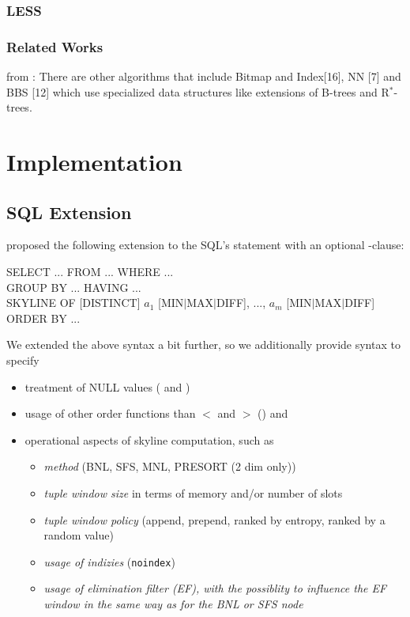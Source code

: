 \subsection{LESS}

\subsection{Related Works}
from \citep{Chaudhuri2006}: 
 There are other algorithms that include Bitmap and Index[16], NN
[7] and BBS [12] which use specialized data structures like
extensions of B-trees and R$^*$-trees.

\chapter{Implementation}
\section{SQL Extension}

\citet{Borzsonyi2001} proposed the following extension to the SQL's  statement with an optional -clause:
\begin{sql}
SELECT ... FROM ... WHERE ... \\
GROUP BY ... HAVING ...       \\
SKYLINE OF \textnormal{[}DISTINCT\textnormal{]} $a_1$ \textnormal{[}MIN$|$MAX$|$DIFF\textnormal{]}, ..., $a_m$ \textnormal{[}MIN$|$MAX$|$DIFF\textnormal{]} \\
ORDER BY ...
\end{sql}

We extended the above syntax a bit further, so we additionally provide syntax to specify
\begin{itemize}
\item treatment of NULL values ( and )
\item usage of other order functions than $<$ and $>$ () and
\item operational aspects of skyline computation, such as 

\begin{itemize}
\item \emph{method} (BNL, SFS, MNL, PRESORT (2 dim only))
\item \emph{tuple window size} in terms of memory and/or number of slots
\item \emph{tuple window policy} (append, prepend, ranked by entropy, ranked by a random value)
\item \emph{usage of indizies} (\texttt{noindex})
\item \emph{usage of elimination filter (EF), with the possiblity to influence the EF window in the same way as for the BNL or SFS node}
\end{itemize}

\end{itemize}

